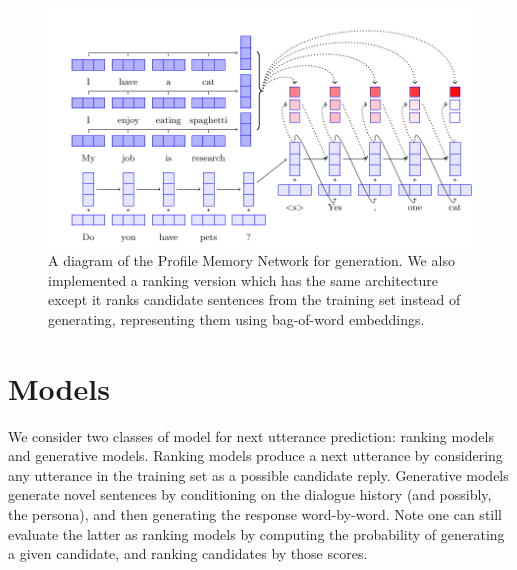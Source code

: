 \ifarxiv
\begin{figure}[t]
	\centering
	\includegraphics[width=\textwidth]{diagram.pdf}
    \caption{\label{fig:PMN-gen}A diagram of the Profile Memory Network for generation. We also implemented a ranking version which has the same architecture except it ranks candidate sentences from the training set instead of generating, representing them using bag-of-word embeddings.}
\end{figure}
\fi

\section{Models}

We consider two classes of model for next utterance prediction: ranking models and generative models.
Ranking models produce a next utterance by considering any utterance in the training set as a possible candidate reply. Generative models 
 generate novel sentences by conditioning on the dialogue history (and possibly, the persona), and then generating the response word-by-word. %
Note one can still evaluate the latter as ranking models by computing the probability of generating a given candidate, and ranking candidates by those scores.

%

